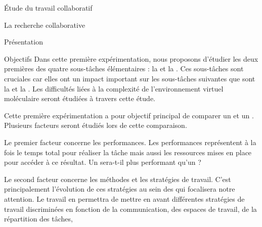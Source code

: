 \documentclass[myfrancais]{mythesis}
\begin{document}
	\begin{mypart}{Étude du travail collaboratif}
		\begin{mychapter}{La recherche collaborative}
			\begin{mysection}{Présentation}
				\begin{mysubsection}{Objectifs}
					Dans cette première expérimentation, nous proposons d'étudier les deux premières des quatre sous-tâches élémentaires : la  et la .
					Ces sous-tâches sont cruciales car elles ont un impact important sur les sous-tâches suivantes que sont la  et la .
					Les difficultés liées à la complexité de l'environnement virtuel moléculaire seront étudiées à travers cette étude.

					Cette première expérimentation a pour objectif principal de comparer un  et un .
					Plusieurs facteurs seront étudiés lors de cette comparaison.

					Le premier facteur concerne les performances.
					Les performances représentent à la fois le temps total pour réaliser la tâche mais aussi les ressources mises en place pour accéder à ce résultat.
					Un  sera-t-il plus performant qu'un  ?

					Le second facteur concerne les méthodes et les stratégies de travail.
					C'est principalement l'évolution de ces stratégies au sein des  qui focalisera notre attention.
					Le travail en  permettra de mettre en avant différentes stratégies de travail discriminées en fonction de la communication, des espaces de travail, de la répartition des tâches, \myetc


\end{mysubsection}
\end{mysection}
\end{mychapter}
\end{mypart}
\end{document}
